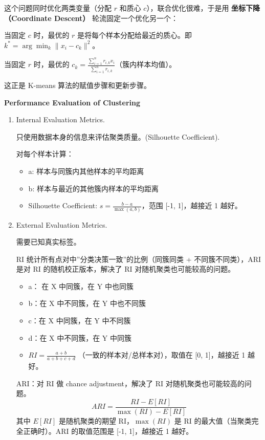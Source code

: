 \documentclass[
]{ctexart}
\providecommand{\tightlist}{%
  \setlength{\itemsep}{0pt}\setlength{\parskip}{0pt}}
\begin{document}
这个问题同时优化两类变量（分配 \(r\) 和质心
\(c\)），联合优化很难，于是用 \textbf{坐标下降（Coordinate Descent）}
轮流固定一个优化另一个：

当固定 \(c\) 时，最优的 \(r\) 是将每个样本分配给最近的质心。即
\(k^* = \arg\min_k \| x_i - c_k \|^2\)。

当固定 \(r\) 时，最优的
\(c_k = \frac{\sum_{i=1}^n r_{i,k} x_i}{\sum_{i=1}^n r_{i,k}}\)（簇内样本均值）。

这正是 K-means 算法的赋值步骤和更新步骤。

\textbf{Performance Evaluation of Clustering}

\begin{enumerate}
\def\labelenumi{\arabic{enumi}.}
\item
  Internal Evaluation Metrics.

  只使用数据本身的信息来评估聚类质量。(Silhouette Coefficient).

  对每个样本计算：

  \begin{itemize}
  \tightlist
  \item
    a: 样本与同簇内其他样本的平均距离
  \item
    b: 样本与最近的其他簇内样本的平均距离
  \item
    Silhouette Coefficient: \(s = \frac{b - a}{\max(a, b)}\)，范围
    {[}-1, 1{]}，越接近 1 越好。
  \end{itemize}
\item
  External Evaluation Metrics.

  需要已知真实标签。

  RI 统计所有点对中''分类决策一致''的比例（同簇同类 +
  不同簇不同类），ARI 是对 RI 的随机校正版本，解决了 RI
  对随机聚类也可能较高的问题。

  \begin{itemize}
  \tightlist
  \item
    a： 在 X 中同簇，在 Y 中也同簇
  \item
    b：在 X 中不同簇，在 Y 中也不同簇
  \item
    c：在 X 中同簇，在 Y 中不同簇
  \item
    d：在 X 中不同簇，在 Y 中同簇
  \item
    \(RI = \frac{a + b}{a + b + c + d}\)
    （一致的样本对/总样本对），取值在 {[}0, 1{]}，越接近 1 越好。
  \end{itemize}

  ARI：对 RI 做 chance adjustment，解决了 RI
  对随机聚类也可能较高的问题。
  \[ARI = \frac{RI - E[RI]}{\max(RI) - E[RI]}\] 其中 \(E[RI]\)
  是随机聚类的期望 RI，\(\max(RI)\) 是 RI
  的最大值（当聚类完全正确时）。ARI 的取值范围是 {[}-1, 1{]}，越接近 1
  越好。
\end{enumerate}
\end{document}
